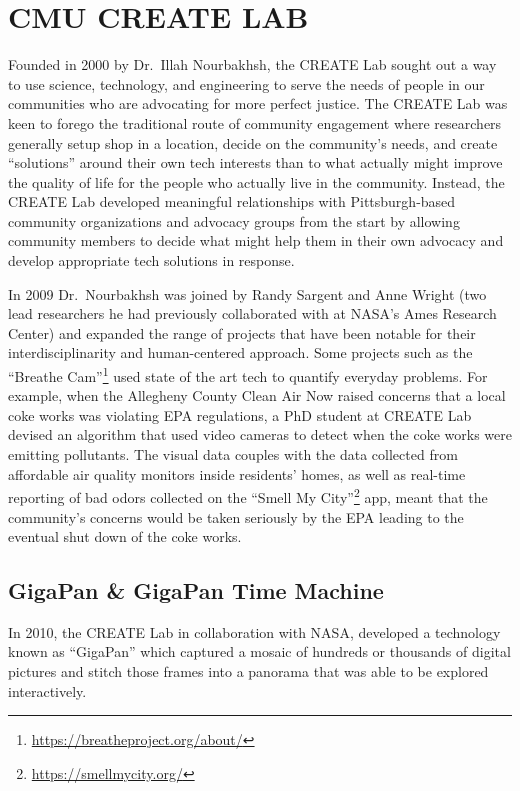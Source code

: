 \documentclass[
]{book}
\renewcommand{\href}[2]{#2\footnote{\url{#1}}}
\begin{document}
\hypertarget{cmu-create-lab}{%
\section{CMU CREATE LAB}\label{cmu-create-lab}}

Founded in 2000 by Dr.~Illah Nourbakhsh, the CREATE Lab sought out a way to use science, technology, and engineering to serve the needs of people in our communities who are advocating for more perfect justice. The CREATE Lab was keen to forego the traditional route of community engagement where researchers generally setup shop in a location, decide on the community's needs, and create ``solutions'' around their own tech interests than to what actually might improve the quality of life for the people who actually live in the community. Instead, the CREATE Lab developed meaningful relationships with Pittsburgh-based community organizations and advocacy groups from the start by allowing community members to decide what might help them in their own advocacy and develop appropriate tech solutions in response.

In 2009 Dr.~Nourbakhsh was joined by Randy Sargent and Anne Wright (two lead researchers he had previously collaborated with at NASA's Ames Research Center) and expanded the range of projects that have been notable for their interdisciplinarity and human-centered approach. Some projects such as the \href{https://breatheproject.org/about/}{``Breathe Cam''} used state of the art tech to quantify everyday problems. For example, when the Allegheny County Clean Air Now raised concerns that a local coke works was violating EPA regulations, a PhD student at CREATE Lab devised an algorithm that used video cameras to detect when the coke works were emitting pollutants. The visual data couples with the data collected from affordable air quality monitors inside residents' homes, as well as real-time reporting of bad odors collected on the \href{https://smellmycity.org/}{``Smell My City''} app, meant that the community's concerns would be taken seriously by the EPA leading to the eventual shut down of the coke works.

\hypertarget{gigapan-gigapan-time-machine}{%
\subsection*{GigaPan \& GigaPan Time Machine}\label{gigapan-gigapan-time-machine}}


In 2010, the CREATE Lab in collaboration with NASA, developed a technology known as ``GigaPan'' which captured a mosaic of hundreds or thousands of digital pictures and stitch those frames into a panorama that was able to be explored interactively.
\end{document}
